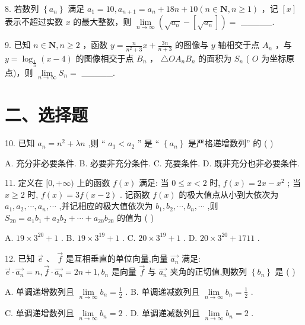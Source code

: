8. 若数列 $\left\{  {a}_{n}\right\}$ 满足 ${a}_{1} = {10},{a}_{n + 1} = {a}_{n} + {18n} + {10}\left( {n \in  \mathbf{N},n \geq  1}\right)$ ，记 $\left\lbrack  x\right\rbrack$ 表示不超过实数 $x$ 的最大整数，则 $\mathop{\lim }\limits_{{n \rightarrow  \infty }}\left( {\sqrt{{a}_{n}} - \left\lbrack  \sqrt{{a}_{n}}\right\rbrack  }\right)  =$ \_\_\_\_\_.

9. 已知 $n \in  \mathbf{N},n \geq  2$ ，函数 $y = \frac{n}{{n}^{2} + 3}x + \frac{3n}{n + 3}$ 的图像与 $y$ 轴相交于点 ${A}_{n}$ ，与 $y = {\log }_{\frac{1}{n}}\left( {x - 4}\right)$ 的图像相交于点 ${B}_{n}$ ， $\bigtriangleup  O{A}_{n}{B}_{n}$ 的面积为 ${S}_{n}$ ( $O$ 为坐标原点)，则 $\mathop{\lim }\limits_{{n \rightarrow  \infty }}{S}_{n} =$ \_\_\_\_\_.

\section*{二、选择题}

10. 已知 ${a}_{n} = {n}^{2} + {\lambda n}$ ,则 “ ${a}_{1} < {a}_{2}$ ” 是 “ $\left\{  {a}_{n}\right\}$ 是严格递增数列” 的 ( )

A. 充分非必要条件. B. 必要非充分条件. C. 充要条件. D. 既非充分也非必要条件.

11. 定义在 $\lbrack 0, + \infty )$ 上的函数 $f\left( x\right)$ 满足: 当 $0 \leq  x < 2$ 时, $f\left( x\right)  = {2x} - {x}^{2}$ ; 当 $x \geq  2$ 时, $f\left( x\right)  = {3f}\left( {x - 2}\right)$ . 记函数 $f\left( x\right)$ 的极大值点从小到大依次为 ${a}_{1},{a}_{2},\cdots ,{a}_{n},\cdots$ ,并记相应的极大值依次为 ${b}_{1},{b}_{2},\cdots ,{b}_{n},\cdots$ ,则 ${S}_{20} = {a}_{1}{b}_{1} + {a}_{2}{b}_{2} + \cdots  + {a}_{20}{b}_{20}$ 的值为 ( )

A. ${19} \times  {3}^{20} + 1$ . B. ${19} \times  {3}^{19} + 1$ . C. ${20} \times  {3}^{19} + 1$ . D. ${20} \times  {3}^{20} + {1711}$ .

12. 已知 $\overrightarrow{e}\text{ 、 }\overrightarrow{f}$ 是互相垂直的单位向量,向量 $\overrightarrow{{a}_{n}}$ 满足: $\overrightarrow{e} \cdot  \overrightarrow{{a}_{n}} = n,\overrightarrow{f} \cdot  \overrightarrow{{a}_{n}} = {2n} + 1,{b}_{n}$ 是向量 $\overrightarrow{f}$ 与 $\overrightarrow{{a}_{n}}$ 夹角的正切值,则数列 $\left\{  {b}_{n}\right\}$ 是 ( )

A. 单调递增数列且 $\mathop{\lim }\limits_{{n \rightarrow  \infty }}{b}_{n} = \frac{1}{2}$ . B. 单调递减数列且 $\mathop{\lim }\limits_{{n \rightarrow  \infty }}{b}_{n} = \frac{1}{2}$ .

C. 单调递增数列且 $\mathop{\lim }\limits_{{n \rightarrow  \infty }}{b}_{n} = 2$ . D. 单调递减数列且 $\mathop{\lim }\limits_{{n \rightarrow  \infty }}{b}_{n} = 2$ .


